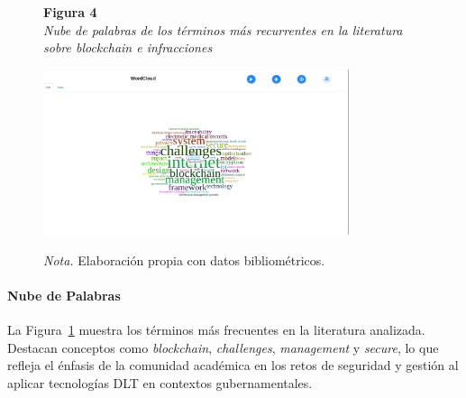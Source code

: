\begin{figure}[htbp]
    \begin{flushleft}
        \textbf{Figura 4}\\[2em]
        \textit{Nube de palabras de los términos más recurrentes en la literatura sobre blockchain e infracciones}
    \end{flushleft}
    \vspace{1em}
    \centering
    \includegraphics[width=0.8\textwidth]{Images/NubePalabras.png}
    \vspace{2em}
    \begin{flushleft}
        \textit{Nota.} Elaboración propia con datos bibliométricos.
    \end{flushleft}
    \label{fig:nube_palabras}
\end{figure}

\paragraph{Nube de Palabras}
La Figura~\ref{fig:nube_palabras} muestra los términos más frecuentes en la literatura analizada. Destacan conceptos como \textit{blockchain}, \textit{challenges}, \textit{management} y \textit{secure}, lo que refleja el énfasis de la comunidad académica en los retos de seguridad y gestión al aplicar tecnologías DLT en contextos gubernamentales.

